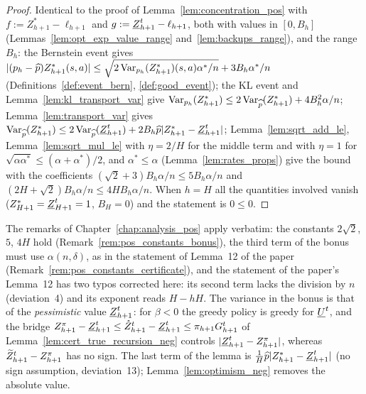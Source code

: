 \begin{proof}
\leanok
Identical to the proof of Lemma~\ref{lem:concentration_pos} with $f := Z^*_{h+1} - \ell_{h+1}$ and
$g := \underline{Z}^t_{h+1} - \ell_{h+1}$, both with values in $[0, B_h]$ (Lemmas~\ref{lem:opt_exp_value_range}
and~\ref{lem:backups_range}), and the range $B_h$: the Bernstein event gives
$\lvert (p_h - \widehat{p})Z^*_{h+1}(s,a) \rvert \le \sqrt{2\operatorname{Var}_{p_h}(Z^*_{h+1})(s,a)\alpha^*/n} + 3B_h\alpha^*/n$
(Definitions~\ref{def:event_bern}, \ref{def:good_event}); the KL event and
Lemma~\ref{lem:kl_transport_var} give $\operatorname{Var}_{p_h}(Z^*_{h+1}) \le 2\operatorname{Var}_{\widehat{p}}(Z^*_{h+1}) + 4B_h^2\alpha/n$;
Lemma~\ref{lem:transport_var} gives $\operatorname{Var}_{\widehat{p}}(Z^*_{h+1}) \le 2\operatorname{Var}_{\widehat{p}}(\underline{Z}^t_{h+1}) + 2B_h\widehat{p}\lvert Z^*_{h+1} - \underline{Z}^t_{h+1} \rvert$;
Lemma~\ref{lem:sqrt_add_le}, Lemma~\ref{lem:sqrt_mul_le} with $\eta = 2/H$ for the middle term and
with $\eta = 1$ for $\sqrt{\alpha\alpha^*} \le (\alpha + \alpha^*)/2$, and $\alpha^* \le \alpha$
(Lemma~\ref{lem:rates_props}) give the bound with the coefficients
$(\sqrt2 + 3)B_h\alpha/n \le 5B_h\alpha/n$ and $(2H + \sqrt2)B_h\alpha/n \le 4HB_h\alpha/n$. When $h = H$ all
the quantities involved vanish ($Z^*_{H+1} = \underline{Z}^t_{H+1} = 1$, $B_H = 0$) and the statement is $0 \le 0$.
\end{proof}

\begin{remark}\label{rem:neg_constants}
The remarks of Chapter~\ref{chap:analysis_pos} apply verbatim: the constants $2\sqrt2$, $5$, $4H$
hold (Remark~\ref{rem:pos_constants_bonus}), the third term of the bonus must use $\alpha(n, \delta)$,
as in the statement of Lemma~12 of the paper (Remark~\ref{rem:pos_constants_certificate}), and
the statement of the paper's Lemma~12 has two typos corrected here: its second term lacks the
division by $n$ (deviation~4) and its exponent reads $H - hH$. The variance in the bonus is that of
the \emph{pessimistic} value $\underline{Z}^t_{h+1}$: for $\beta < 0$ the greedy policy is greedy for $\underline{U}^t$, and the
bridge $Z^\pi_{h+1} - \underline{Z}^t_{h+1} \le \mathring{Z}^t_{h+1} - \underline{Z}^t_{h+1} \le \pi_{h+1}G^t_{h+1}$ of
Lemma~\ref{lem:cert_true_recursion_neg} controls $\lvert \underline{Z}^t_{h+1} - Z^\pi_{h+1} \rvert$, whereas
$\widetilde{Z}^t_{h+1} - Z^\pi_{h+1}$ has no sign. The last term of the lemma is $\frac1H\widehat{p}\lvert Z^*_{h+1} - \underline{Z}^t_{h+1} \rvert$
(no sign assumption, deviation~13); Lemma~\ref{lem:optimism_neg} removes the absolute value.
\end{remark}

